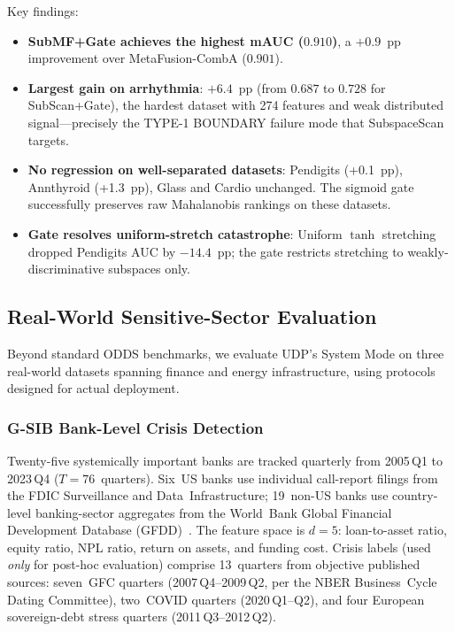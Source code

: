\documentclass[journal]{IEEEtran}
\begin{document}
Key findings:
\begin{itemize}
  \item \textbf{SubMF+Gate achieves the highest mAUC ($0.910$)}, a $+0.9$~pp improvement over MetaFusion-CombA ($0.901$).
  \item \textbf{Largest gain on arrhythmia}: $+6.4$~pp (from $0.687$ to $0.728$ for SubScan+Gate), the hardest dataset with 274 features and weak distributed signal---precisely the TYPE-1 BOUNDARY failure mode that SubspaceScan targets.
  \item \textbf{No regression on well-separated datasets}: Pendigits (+0.1~pp), Annthyroid (+1.3~pp), Glass and Cardio unchanged. The sigmoid gate successfully preserves raw Mahalanobis rankings on these datasets.
  \item \textbf{Gate resolves uniform-stretch catastrophe}: Uniform $\tanh$ stretching dropped Pendigits AUC by $-14.4$~pp; the gate restricts stretching to weakly-discriminative subspaces only.
\end{itemize}

\subsection{Real-World Sensitive-Sector Evaluation}
\label{ssec:real_world}

Beyond standard ODDS benchmarks, we evaluate UDP's System Mode on three real-world datasets spanning finance and energy infrastructure, using protocols designed for actual deployment.

\subsubsection{G-SIB Bank-Level Crisis Detection}
\label{sssec:gsib}

Twenty-five systemically important banks are tracked quarterly from 2005\,Q1 to 2023\,Q4 ($T{=}76$~quarters). Six~US banks use individual call-report filings from the FDIC Surveillance and Data~Infrastructure; 19~non-US banks use country-level banking-sector aggregates from the World~Bank Global Financial Development Database (GFDD)~\cite{worldbank2024gfdd}. The feature space is $d{=}5$: loan-to-asset ratio, equity ratio, NPL ratio, return on assets, and funding cost. Crisis labels (used \emph{only} for post-hoc evaluation) comprise 13~quarters from objective published sources: seven~GFC quarters (2007\,Q4--2009\,Q2, per the NBER Business~Cycle Dating Committee), two~COVID quarters (2020\,Q1--Q2), and four European sovereign-debt stress quarters (2011\,Q3--2012\,Q2).
\end{document}
